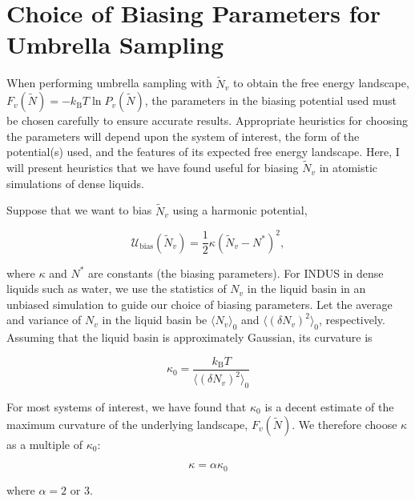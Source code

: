 \documentclass[11pt,notitlepage]{article}
\newcommand{\kB}{k_{\text{B}}}
\begin{document}

\section{Choice of Biasing Parameters for Umbrella Sampling}

When performing umbrella sampling with $\tilde{N}_v$ to obtain the free energy landscape, $F_v(\tilde{N}) = -\kB T \ln P_v(\tilde{N})$, the parameters in the biasing potential used must be chosen carefully to ensure accurate results. Appropriate heuristics for choosing the parameters will depend upon the system of interest, the form of the potential(s) used, and the features of its expected free energy landscape. Here, I will present heuristics that we have found useful for biasing $\tilde{N}_v$ in atomistic simulations of dense liquids.


Suppose that we want to bias $\tilde{N}_v$ using a harmonic potential,

\begin{equation} \label{eqn:harmonicbias}
	\mathcal{U}_{\text{bias}}(\tilde{N}_v) = \frac{1}{2} \kappa (\tilde{N}_v - N^*)^2,
\end{equation}

\noindent where $\kappa$ and $N^*$ are constants (the biasing parameters). For INDUS in dense liquids such as water, we use the statistics of $N_v$ in the liquid basin in an unbiased simulation to guide our choice of biasing parameters. Let the average and variance of $N_v$ in the liquid basin be $\langle N_v \rangle_0$ and $\langle (\delta N_v)^2 \rangle_0$, respectively. Assuming that the liquid basin is approximately Gaussian, its curvature is

\begin{equation}
	\kappa_0 = \frac{k_{\text{B}} T}{\langle (\delta N_v)^2 \rangle_0}
\end{equation}


For most systems of interest, we have found that $\kappa_0$ is a decent estimate of the maximum curvature of the underlying landscape, $F_v(\tilde{N})$. We therefore choose $\kappa$ as a multiple of $\kappa_0$:

\begin{equation}
	\kappa = \alpha \kappa_0
\end{equation}

\noindent where $\alpha = 2$ or $3$. 

\end{document}
